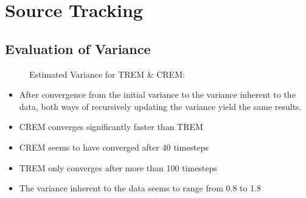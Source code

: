 \section{Source Tracking}

\subsection{Evaluation of Variance}
\begin{figure}[H]
    \centering
    \setlength\figureheight{7cm}
    \small
    \setlength{}
    
    \caption[Estimated Variance for TREM \& CREM]{Estimated Variance for TREM \& CREM: \itshape }
    \label{fig:trackVarComp}
\end{figure}

\begin{itemize}
    \item After convergence from the initial variance to the variance inherent to the data, both ways of recursively updating the variance yield the same results.
    \item CREM converges significantly faster than TREM
    \item CREM seems to have converged after 40 timesteps
    \item TREM only converges after more than 100 timesteps
    \item The variance inherent to the data seems to range from 0.8 to 1.8
\end{itemize}